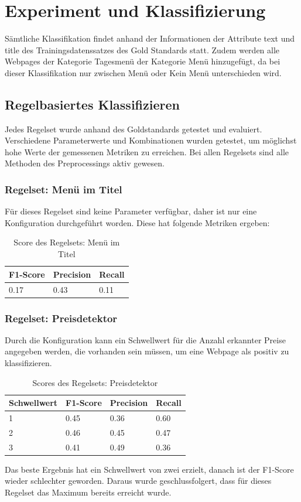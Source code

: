 \chapter{Experiment und Klassifizierung}
\label{chap:exp_class}
Sämtliche Klassifikation findet anhand der Informationen der Attribute \glqq text\grqq{} und \glqq title\grqq{} des Trainingsdatenssatzes des Gold Standards statt.
Zudem werden alle Webpages der Kategorie \glqq Tagesmenü\grqq{} der Kategorie \glqq Menü\grqq{} hinzugefügt, da bei dieser Klassifikation nur zwischen \glqq Menü\grqq{} oder \glqq Kein Menü\grqq{} unterschieden wird.
\section{Regelbasiertes Klassifizieren}
Jedes Regelset wurde anhand des Goldstandards getestet und evaluiert.
Verschiedene Parameterwerte und Kombinationen wurden getestet, um möglichst hohe Werte der gemessenen Metriken zu erreichen.
Bei allen Regelsets sind alle Methoden des Preprocessings aktiv gewesen. 
\subsection{Regelset: Menü im Titel}
Für dieses Regelset sind keine Parameter verfügbar, daher ist nur eine Konfiguration durchgeführt worden.
Diese hat folgende Metriken ergeben:\\
\begin{table}[H]
\caption{Score des Regelsets: Menü im Titel}
\centering
\begin{tabular}{|l|l|l|}
	\hline
	F1-Score & Precision & Recall\\
	\hline
	0.17 & 0.43 & 0.11  \\
	\hline
\end{tabular}
\end{table}
\subsection{Regelset: Preisdetektor}
Durch die Konfiguration kann ein Schwellwert für die Anzahl erkannter Preise angegeben werden, die vorhanden sein müssen, um eine Webpage als positiv zu klassifizieren.\\
\begin{table}[H]
\caption{Scores des Regelsets: Preisdetektor}
\centering
\begin{tabular}{|l|l|l|l|}
	\hline
	Schwellwert & F1-Score & Precision & Recall\\
	\hline
	1 & 0.45 & 0.36 & 0.60  \\
	2 & 0.46 & 0.45 & 0.47 \\
	3 & 0.41 & 0.49 & 0.36 \\
	\hline
\end{tabular}
\end{table}
Das beste Ergebnis hat ein Schwellwert von zwei erzielt, danach ist der F1-Score wieder schlechter geworden.
Daraus wurde geschlussfolgert, dass für dieses Regelset das Maximum bereits erreicht wurde.
